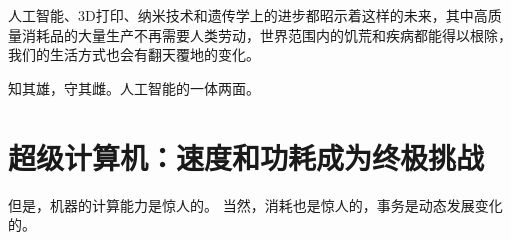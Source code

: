 %

人工智能、3D打印、纳米技术和遗传学上的进步都昭示着这样的未来，其中高质量消耗品的大量生产不再需要人类劳动，世界范围内的饥荒和疾病都能得以根除，我们的生活方式也会有翻天覆地的变化。


知其雄，守其雌。人工智能的一体两面。


\section{超级计算机：速度和功耗成为终极挑战}

但是，机器的计算能力是惊人的。
当然，消耗也是惊人的，事务是动态发展变化的。



